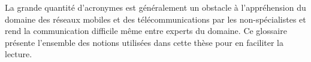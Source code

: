 \documentclass[../main.tex]{subfiles}
\begin{document}
\initSubfile
{}

\begin{printGlossaryUnsafe}
La grande quantité d’acronymes est généralement un obstacle à l’appréhension du domaine des réseaux mobiles et des télécommunications par les non-spécialistes et rend la communication difficile même entre experts du domaine. Ce glossaire présente l’ensemble des notions utilisées dans cette thèse pour en faciliter la lecture.
\end{printGlossaryUnsafe}
\end{document}
